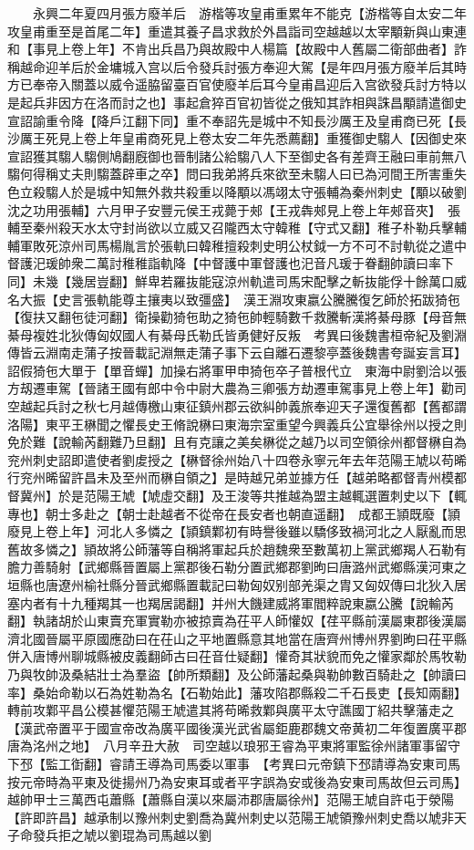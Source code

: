 　　永興二年夏四月張方廢羊后　游楷等攻皇甫重累年不能克【游楷等自太安二年攻皇甫重至是首尾二年】重遣其養子昌求救於外昌詣司空越越以太宰顒新與山東連和【事見上卷上年】不肯出兵昌乃與故殿中人楊篇【故殿中人舊屬二衛部曲者】詐稱越命迎羊后於金墉城入宫以后令發兵討張方奉迎大駕【是年四月張方廢羊后其時方已奉帝入關蓋以威令遥脇留臺百官使廢羊后耳今皇甫昌迎后入宫欲發兵討方特以是起兵非因方在洛而討之也】事起倉猝百官初皆從之俄知其詐相與誅昌顒請遣御史宣詔諭重令降【降戶江翻下同】重不奉詔先是城中不知長沙厲王及皇甫商已死【長沙厲王死見上卷上年皇甫商死見上卷太安二年先悉薦翻】重獲御史騶人【因御史來宣詔獲其騶人騶側鳩翻廐御也晉制諸公給騶八人下至御史各有差齊王融曰車前無八騶何得稱丈夫則騶蓋辟車之卒】問曰我弟將兵來欲至未騶人曰已為河間王所害重失色立殺騶人於是城中知無外救共殺重以降顒以馮翊太守張輔為秦州刺史【顒以破劉沈之功用張輔】六月甲子安豐元侯王戎薨于郟【王戎犇郟見上卷上年郟音夾】　張輔至秦州殺天水太守封尚欲以立威又召隴西太守韓稚【守式又翻】稚子朴勒兵擊輔輔軍敗死涼州司馬楊胤言於張軌曰韓稚擅殺刺史明公杖鉞一方不可不討軌從之遣中督護汜瑗帥衆二萬討稚稚詣軌降【中督護中軍督護也汜音凡瑗于眷翻帥讀曰率下同】未幾【幾居豈翻】鮮卑若羅抜能寇涼州軌遣司馬宋配擊之斬抜能俘十餘萬口威名大振【史言張軌能尊主攘夷以致彊盛】　漢王淵攻東嬴公騰騰復乞師於拓跋猗㐌【復扶又翻㐌徒河翻】衛操勸猗㐌助之猗㐌帥輕騎數千救騰斬漢將綦母豚【母音無綦母複姓北狄傳匈奴國人有綦母氏勒氏皆勇健好反叛　考異曰後魏書桓帝紀及劉淵傳皆云淵南走蒲子按晉載記淵無走蒲子事下云自離石遷黎亭蓋後魏書夸誕妄言耳】詔假猗㐌大單于【單音蟬】加操右將軍甲申猗㐌卒子普根代立　東海中尉劉洽以張方刼遷車駕【晉諸王國有郎中令中尉大農為三卿張方劫遷車駕事見上卷上年】勸司空越起兵討之秋七月越傳檄山東征鎮州郡云欲糾帥義旅奉迎天子還復舊都【舊都謂洛陽】東平王楙聞之懼長史王脩說楙曰東海宗室重望今興義兵公宜舉徐州以授之則免於難【說輸芮翻難乃旦翻】且有克讓之美矣楙從之越乃以司空領徐州都督楙自為兖州刺史詔即遣使者劉䖍授之【楙督徐州始八十四卷永寧元年去年范陽王虓以苟晞行兖州晞留許昌未及至州而楙自領之】是時越兄弟並據方任【越弟略都督青州模都督冀州】於是范陽王虓【虓虛交翻】及王浚等共推越為盟主越輒選置刺史以下【輒專也】朝士多赴之【朝士赴越者不從帝在長安者也朝直遥翻】　成都王頴既廢【頴廢見上卷上年】河北人多憐之【頴鎮鄴初有時譽後雖以驕侈致禍河北之人厭亂而思舊故多憐之】頴故將公師藩等自稱將軍起兵於趙魏衆至數萬初上黨武鄉羯人石勒有膽力善騎射【武鄉縣晉置屬上黨郡後石勒分置武鄉郡劉昫曰唐潞州武鄉縣漢河東之垣縣也唐遼州榆社縣分晉武鄉縣置載記曰勒匈奴别部羌渠之胄又匈奴傳曰北狄入居塞内者有十九種羯其一也羯居謁翻】并州大饑建威將軍閻粹說東嬴公騰【說輸芮翻】執諸胡於山東賣充軍實勒亦被掠賣為茌平人師懽奴【荏平縣前漢屬東郡後漢屬濟北國晉屬平原國應劭曰在茌山之平地置縣意其地當在唐齊州博州界劉昫曰茌平縣併入唐博州聊城縣被皮義翻師古曰茌音仕疑翻】懽奇其狀貌而免之懽家鄰於馬牧勒乃與牧帥汲桑結壯士為羣盜【帥所類翻】及公師藩起桑與勒帥數百騎赴之【帥讀曰率】桑始命勒以石為姓勒為名【石勒始此】藩攻陷郡縣殺二千石長吏【長知兩翻】轉前攻鄴平昌公模甚懼范陽王虓遣其將苟晞救鄴與廣平太守譙國丁紹共擊藩走之【漢武帝置平于國宣帝改為廣平國後漢光武省屬鉅鹿郡魏文帝黄初二年復置廣平郡唐為洺州之地】　八月辛丑大赦　司空越以琅邪王睿為平東將軍監徐州諸軍事留守下邳【監工衘翻】睿請王導為司馬委以軍事　【考異曰元帝鎮下邳請導為安東司馬按元帝時為平東及徙揚州乃為安東耳或者平字誤為安或後為安東司馬故但云司馬】越帥甲士三萬西屯蕭縣【蕭縣自漢以來屬沛郡唐屬徐州】范陽王虓自許屯于滎陽【許即許昌】越承制以豫州刺史劉喬為冀州刺史以范陽王虓領豫州刺史喬以虓非天子命發兵拒之虓以劉琨為司馬越以劉